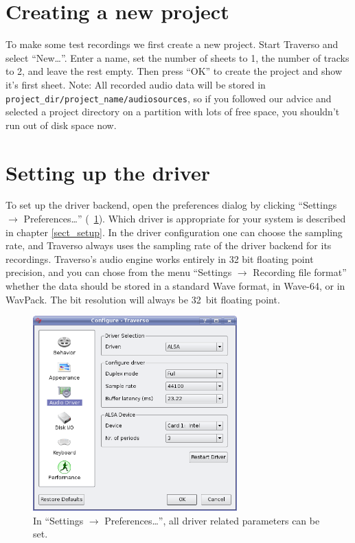 \section{Creating a new project}
To make some test recordings we first create a new project. Start Traverso and select ``New\dots''. Enter a name, set the number of sheets to 1, the number of tracks to 2, and leave the rest empty. Then press ``OK'' to create the project and show it's first sheet. Note: All recorded audio data will be stored in \texttt{project\_dir/project\_name/audiosources}, so if you followed our advice and selected a project directory on a partition with lots of free space, you shouldn't run out of disk space now.

\section{Setting up the driver}
To set up the driver backend, open the preferences dialog by clicking ``Settings $\rightarrow$ Preferences\dots'' (\FigB\ \ref{fig_driversettings}). Which driver is appropriate for your system is described in chapter \ref{sect_setup}. In the driver configuration one can choose the sampling rate, and Traverso always uses the sampling rate of the driver backend for its recordings. Traverso's audio engine works entirely in 32 bit floating point precision, and you can chose from the menu ``Settings $\rightarrow$ Recording file format'' whether the data should be stored in a standard Wave format, in Wave-64, or in WavPack. The bit resolution will always be 32~bit floating point.

\begin{figure}
 \centering\includegraphics[width=0.7\textwidth]{images/driversettings.png}
 \caption{In ``Settings $\rightarrow$ Preferences\dots'', all driver related parameters can be set.}
 \label{fig_driversettings}
\end{figure}

